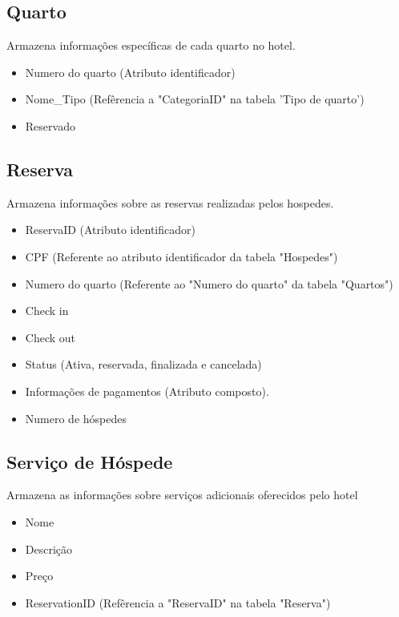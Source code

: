 \subsection{Quarto}

Armazena informações específicas de cada quarto no hotel.

\begin{itemize}
    \item Numero do quarto (Atributo identificador)
    \item Nome\_Tipo (Refêrencia a "CategoriaID" na tabela 'Tipo de quarto')
    \item Reservado
\end{itemize}

\subsection{Reserva}

Armazena informações sobre as reservas realizadas pelos hospedes.

\begin{itemize}
    \item ReservaID (Atributo identificador)
    \item CPF (Referente ao atributo identificador da tabela "Hospedes")
    \item Numero do quarto (Referente ao "Numero do quarto" da tabela "Quartos")
    \item Check in
    \item Check out
    \item Status (Ativa, reservada, finalizada e cancelada)
    \item Informações de pagamentos (Atributo composto).
    \item Numero de hóspedes
\end{itemize}

\subsection{Serviço de Hóspede}

Armazena as informações sobre serviços adicionais oferecidos pelo hotel

\begin{itemize}
    \item Nome
    \item Descrição
    \item Preço
    \item ReservationID (Refêrencia a "ReservaID" na tabela "Reserva")
\end{itemize}


